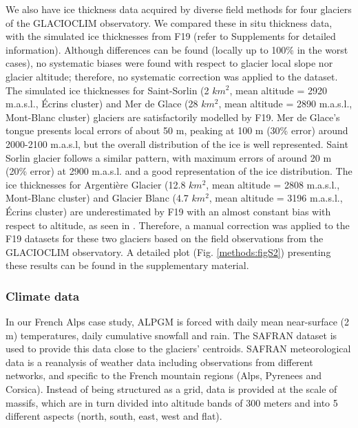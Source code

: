 We also have ice thickness data acquired by diverse field methods \citep[seismic, ground penetrating radar or hot water drilling,][]{rabatel_estimation_2018} for four glaciers of the GLACIOCLIM observatory. We compared these in situ thickness data, with the simulated ice thicknesses from F19 (refer to Supplements for detailed information). Although differences can be found (locally up to 100\% in the worst cases), no systematic biases were found with respect to glacier local slope nor glacier altitude; therefore, no systematic correction was applied to the dataset. The simulated ice thicknesses for Saint-Sorlin (2 \(km^2\), mean altitude = 2920 m.a.s.l., Écrins cluster) and Mer de Glace (28 \(km^2\), mean altitude = 2890 m.a.s.l., Mont-Blanc cluster) glaciers are  satisfactorily modelled by F19. Mer de Glace's tongue presents local errors of about 50 m, peaking at 100 m (30\% error) around 2000-2100 m.a.s.l, but the overall distribution of the ice is well represented. Saint Sorlin glacier follows a similar pattern, with maximum errors of around 20 m (20\% error) at 2900 m.a.s.l. and a good representation of the ice distribution. The ice thicknesses for Argentière Glacier (12.8 \(km^2\), mean altitude = 2808 m.a.s.l., Mont-Blanc cluster) and Glacier Blanc (4.7 \(km^2\), mean altitude = 3196 m.a.s.l., Écrins cluster) are underestimated by F19 with an almost constant bias with respect to altitude, as seen in \citet{rabatel_estimation_2018}. Therefore, a manual correction was applied to the F19 datasets for these two glaciers based on the field observations from the GLACIOCLIM observatory. A detailed plot (Fig. \ref{methods:figS2}) presenting these results can be found in the supplementary material.

\subsubsection{Climate data}

In our French Alps case study, ALPGM is forced with daily mean near-surface (2 m) temperatures, daily cumulative snowfall and rain. The SAFRAN dataset is used to provide this data close to the glaciers’ centroids. SAFRAN meteorological data \citep{durand_reanalysis_2009} is a reanalysis of weather data including observations from different networks, and specific to the French mountain regions (Alps, Pyrenees and Corsica). Instead of being structured as a grid, data is provided at the scale of massifs, which are in turn divided into altitude bands of 300 meters and into 5 different aspects (north, south, east, west and flat). 

